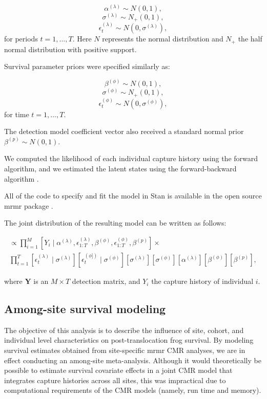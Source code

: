 \documentclass[9pt,twoside,lineno]{pnas-new}
\begin{document}
\[\alpha^{(\lambda)} \sim N(0,1),\]
\[\sigma^{(\lambda)} \sim N_+(0,1),\]
\[\epsilon^{(\lambda)}_t \sim N(0, \sigma^{(\lambda)}),\] for periods
\(t=1, ..., T\). Here \(N\) represents the normal distribution and
\(N_+\) the half normal distribution with positive support.

Survival parameter priors were specified similarly as:

\[\beta^{(\phi)} \sim N(0, 1),\] \[\sigma^{(\phi)} \sim N_+(0, 1),\]
\[\epsilon^{(\phi)}_t \sim N(0, \sigma^{(\phi)}),\] for time
\(t=1, ..., T\).

The detection model coefficient vector also received a standard normal
prior \(\beta^{(p)} \sim N(0, 1)\).

We computed the likelihood of each individual capture history using the
forward algorithm, and we estimated the latent states using the
forward-backward algorithm \citep{zucchini2009, joseph2018}.

All of the code to specify and fit the model in Stan is available in the
open source mrmr package \citep{joseph2019}.

The joint distribution of the resulting model can be written as follows:

\begin{multline*}
[\alpha^{(\lambda)}, \sigma^{(\lambda)}, \epsilon^{(\lambda)}_{1:T}, \beta^{(\phi)}, \sigma^{(\phi)}, \epsilon^{(\phi)}_{1:T}, \beta^{(p)} \mid \pmb Y] \propto \prod_{i=1}^M [Y_i \mid \alpha^{(\lambda)}, \epsilon^{(\lambda)}_{1:T}, \beta^{(\phi)}, \epsilon^{(\phi)}_{1:T}, \beta^{(p)}] \times \\
\prod_{t=1}^T [\epsilon_t^{(\lambda)} \mid \sigma^{(\lambda)}] [\epsilon_t^{(\phi])} \mid \sigma^{(\phi)}] [\sigma^{(\lambda)}] [\sigma^{(\phi)}] [\alpha^{(\lambda)}] [\beta^{(\phi)}] [\beta^{(p)}],
\end{multline*}

where \(\pmb Y\) is an \(M \times T\) detection matrix, and \(Y_i\) the
capture history of individual \(i\).

\hypertarget{among-site-survival-modeling}{%
\subsection{Among-site survival
modeling}\label{among-site-survival-modeling}}

The objective of this analysis is to describe the influence of site,
cohort, and individual level characteristics on post-translocation frog
survival. By modeling survival estimates obtained from site-specific
mrmr CMR analyses, we are in effect conducting an among-site
meta-analysis. Although it would theoretically be possible to estimate
survival covariate effects in a joint CMR model that integrates capture
histories across all sites, this was impractical due to computational
requirements of the CMR models (namely, run time and memory).
\end{document}
